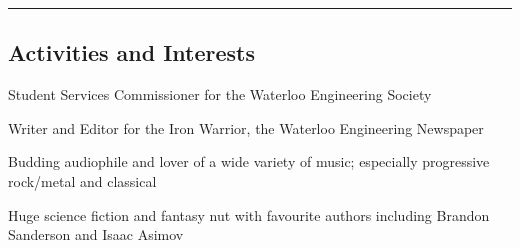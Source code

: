 \documentclass[10pt,letterpaper]{article}
\begin{document}
\hrule
\vspace{-0.4em}
\subsection*{Activities and Interests}

\begin{itemize*}
\item Student Services Commissioner for the Waterloo Engineering Society
\item Writer and Editor for the Iron Warrior, the Waterloo Engineering Newspaper
\item Budding audiophile and lover of a wide variety of music; especially progressive rock/metal and classical
\item Huge science fiction and fantasy nut with favourite authors including Brandon Sanderson and Isaac Asimov

\end{itemize*}
\end{document}
